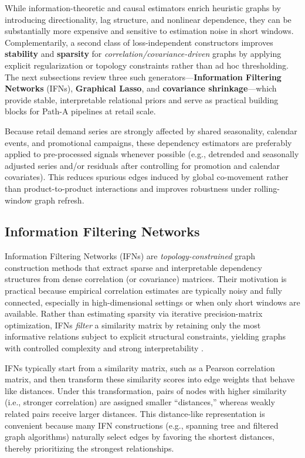 While information-theoretic and causal estimators enrich heuristic graphs by introducing directionality, lag structure, and nonlinear dependence, they can be substantially more expensive and sensitive to estimation noise in short windows.
Complementarily, a second class of loss-independent constructors improves \textbf{stability} and \textbf{sparsity} for \emph{correlation/covariance-driven} graphs by applying explicit regularization or topology constraints rather than ad hoc thresholding. The next subsections review three such generators---\textbf{Information Filtering Networks} (IFNs), \textbf{Graphical Lasso}, and \textbf{covariance shrinkage}---which provide stable, interpretable relational priors and serve as practical building blocks for Path-A pipelines at retail scale.

Because retail demand series are strongly affected by shared seasonality, calendar events, and promotional campaigns, these dependency estimators are preferably applied to pre-processed signals whenever possible (e.g., detrended and seasonally adjusted series and/or residuals after controlling for promotion and calendar covariates). This reduces spurious edges induced by global co-movement rather than product-to-product interactions and improves robustness under rolling-window graph refresh.

\subsection{Information Filtering Networks}
\label{subsec:ifn}

Information Filtering Networks (IFNs) are \emph{topology-constrained} graph construction methods that extract sparse and interpretable dependency structures from dense correlation (or covariance) matrices. Their motivation is practical because empirical correlation estimates are typically noisy and fully connected, especially in high-dimensional settings or when only short windows are available. Rather than estimating sparsity via iterative precision-matrix optimization, IFNs \emph{filter} a similarity matrix by retaining only the most informative relations subject to explicit structural constraints, yielding graphs with controlled complexity and strong interpretability \cite{wang2022sparsificationfilteringspatialtemporalgnn}.

IFNs typically start from a similarity matrix, such as a Pearson correlation matrix, and then transform these similarity scores into edge weights that behave like distances. Under this transformation, pairs of nodes with higher similarity (i.e., stronger correlation) are assigned smaller “distances,” whereas weakly related pairs receive larger distances. This distance-like representation is convenient because many IFN constructions (e.g., spanning tree and filtered graph algorithms) naturally select edges by favoring the shortest distances, thereby prioritizing the strongest relationships.


